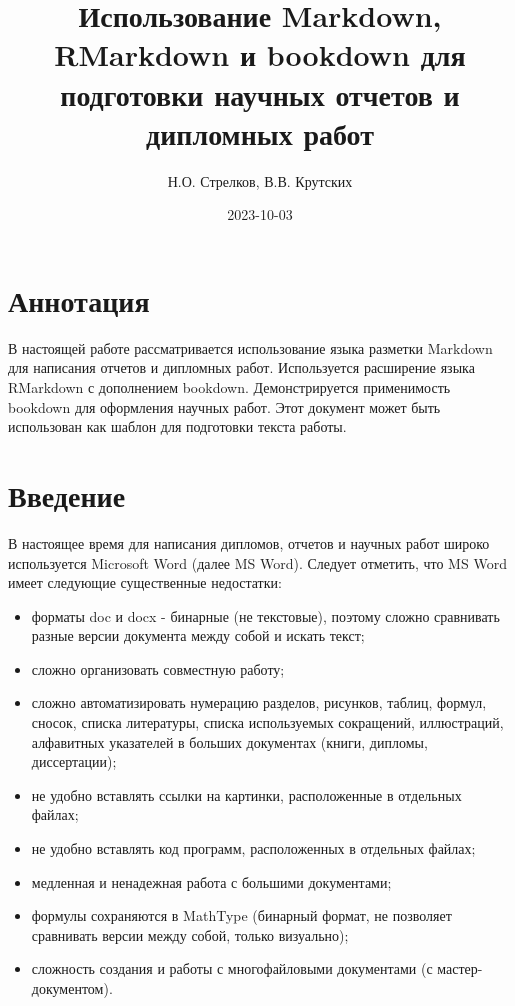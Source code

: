 \documentclass[
  a4paper,
]{book}
\title{Использование Markdown, RMarkdown и bookdown для подготовки научных отчетов и дипломных работ}
\author{Н.О. Стрелков, В.В. Крутских}
\date{2023-10-03}
\providecommand{\tightlist}{%
  \setlength{\itemsep}{0pt}\setlength{\parskip}{0pt}}
\theoremstyle{definition}
\theoremstyle{definition}
\theoremstyle{definition}
\theoremstyle{definition}
\theoremstyle{remark}
\begin{document}
\maketitle


\renewcommand*\contentsname{Содержание}
{
\setcounter{tocdepth}{4}
\tableofcontents
}
\chapter*{Аннотация}\label{index}

В настоящей работе рассматривается использование языка разметки Markdown для написания отчетов и дипломных работ. Используется расширение языка RMarkdown с дополнением bookdown. Демонстрируется применимость bookdown для оформления научных работ. Этот документ может быть использован как шаблон для подготовки текста работы.

\chapter*{Введение}\label{intro}

В настоящее время для написания дипломов, отчетов и научных работ широко используется Microsoft Word (далее MS Word). Следует отметить, что MS Word имеет следующие существенные недостатки:

\begin{itemize}
\tightlist
\item
  форматы doc и docx - бинарные (не текстовые), поэтому сложно сравнивать разные версии документа между собой и искать текст;
\item
  сложно организовать совместную работу;
\item
  сложно автоматизировать нумерацию разделов, рисунков, таблиц, формул, сносок, списка литературы, списка используемых сокращений, иллюстраций, алфавитных указателей в больших документах (книги, дипломы, диссертации);
\item
  не удобно вставлять ссылки на картинки, расположенные в отдельных файлах;
\item
  не удобно вставлять код программ, расположенных в отдельных файлах;
\item
  медленная и ненадежная работа с большими документами;
\item
  формулы сохраняются в MathType (бинарный формат, не позволяет сравнивать версии между собой, только визуально);
\item
  сложность создания и работы с многофайловыми документами (с мастер-документом).
\end{itemize}
\end{document}

